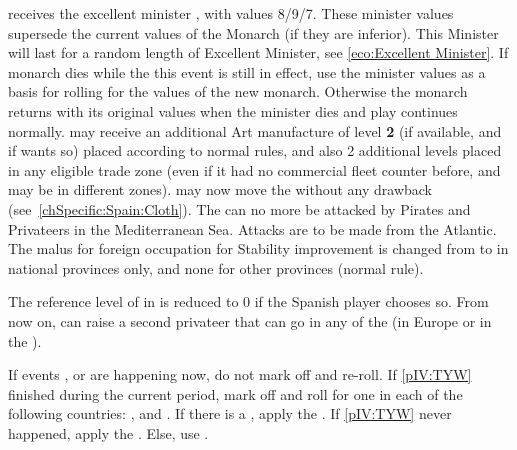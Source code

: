 \phevnt
\aparag \SPA receives the excellent minister , with values
8/9/7.  These minister values supersede the current values of the Monarch (if
they are inferior). This Minister will last for a random length of Excellent
Minister, see \ref{eco:Excellent Minister}.
\aparag If \SPA monarch dies while the this event is still in effect, use the
minister values as a basis for rolling for the values of the new
monarch. Otherwise the monarch returns with its original values when the
minister dies and play continues normally.
\aparag \SPA may receive an additional Art manufacture of level {\bf 2} (if
available, and if \SPA wants so) placed according to normal rules, and also 2
additional \TradeFLEET levels placed in any eligible trade zone (even if it
had no \SPA commercial fleet counter before, and may be in different zones).
\bparag \SPA may now move the  \MNU without any drawback
(see~\ref{chSpecific:Spain:Cloth}).
\aparag The  can no more be attacked by Pirates and Privateers in
the Mediterranean Sea. Attacks are to be made from the Atlantic.
\aparag The malus for foreign occupation for Stability improvement is changed
from  to  in national provinces only, and none for other
provinces (normal rule).

\aparag The reference level of \paysGenes in \CTZ \SPA is reduced to 0 if the
Spanish player chooses so.
\aparag From now on, \SPA can raise a second privateer that can go in any \STZ
of the  (in Europe or in the \ROTW).





\aparag If events , 
or  are happening now, do not mark off and re-roll.
\aparag If \ref{pIV:TYW} finished during the current period, mark off and roll
for one \REVOLT in each of the following countries: \AUT, and \FRA.
\aparag If there is a \GE, apply the .
\aparag If \ref{pIV:TYW} never happened, apply the
.
\aparag Else, use .



